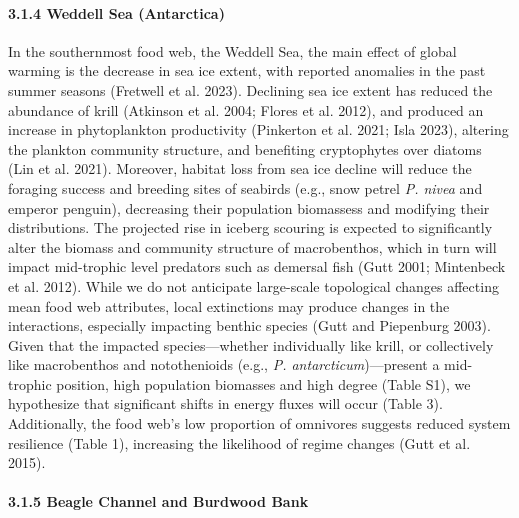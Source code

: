\documentclass[
]{article}
\begin{document}
\paragraph{3.1.4 Weddell Sea
(Antarctica)}\label{weddell-sea-antarctica-1}

In the southernmost food web, the Weddell Sea, the main effect of global
warming is the decrease in sea ice extent, with reported anomalies in
the past summer seasons (Fretwell et al. 2023). Declining sea ice extent
has reduced the abundance of krill (Atkinson et al. 2004; Flores et al.
2012), and produced an increase in phytoplankton productivity (Pinkerton
et al. 2021; Isla 2023), altering the plankton community structure, and
benefiting cryptophytes over diatoms (Lin et al. 2021). Moreover,
habitat loss from sea ice decline will reduce the foraging success and
breeding sites of seabirds (e.g., snow petrel \emph{P. nivea} and
emperor penguin), decreasing their population biomassess and modifying
their distributions. The projected rise in iceberg scouring is expected
to significantly alter the biomass and community structure of
macrobenthos, which in turn will impact mid-trophic level predators such
as demersal fish (Gutt 2001; Mintenbeck et al. 2012). While we do not
anticipate large-scale topological changes affecting mean food web
attributes, local extinctions may produce changes in the interactions,
especially impacting benthic species (Gutt and Piepenburg 2003). Given
that the impacted species---whether individually like krill, or
collectively like macrobenthos and notothenioids (e.g., \emph{P.
antarcticum})---present a mid-trophic position, high population
biomasses and high degree (Table S1), we hypothesize that significant
shifts in energy fluxes will occur (Table 3). Additionally, the food
web's low proportion of omnivores suggests reduced system resilience
(Table 1), increasing the likelihood of regime changes (Gutt et al.
2015).

\paragraph{3.1.5 Beagle Channel and Burdwood
Bank}\label{beagle-channel-and-burdwood-bank}
\end{document}
